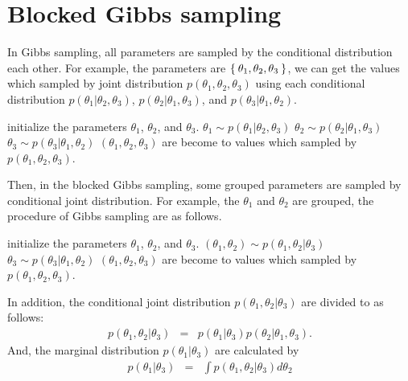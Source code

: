 \documentclass[a4paper]{article}
\begin{document}
	\section{Blocked Gibbs sampling}
	In Gibbs sampling, all parameters are sampled by the conditional distribution each other.
	For example, the parameters are $\Set{\theta_1, \theta_2, \theta_3}$, we can get the values which sampled by joint distribution $p(\theta_1, \theta_2, \theta_3)$ using each conditional distribution $p(\theta_1 | \theta_2, \theta_3)$, $p(\theta_2 | \theta_1, \theta_3)$, and $p(\theta_3 | \theta_1, \theta_2)$.
	\begin{algorithmic}[1]
		\STATE initialize the parameters $\theta_1$, $\theta_2$, and $\theta_3$.
			\STATE $\theta_1 \sim p(\theta_1 | \theta_2, \theta_3)$
			\STATE $\theta_2 \sim p(\theta_2 | \theta_1, \theta_3)$
			\STATE $\theta_ 3\sim p(\theta_3 | \theta_1, \theta_2)$
		\ENDWHILE
		\STATE $(\theta_1, \theta_2, \theta_3)$ are become to values which sampled by $p(\theta_1, \theta_2, \theta_3)$.
	\end{algorithmic}
	Then, in the blocked Gibbs sampling, some grouped parameters are sampled by conditional joint distribution.
	For example, the $\theta_1$ and $\theta_2$ are grouped, the procedure of Gibbs sampling are as follows.
	\begin{algorithmic}[1]
		\STATE initialize the parameters $\theta_1$, $\theta_2$, and $\theta_3$.
			\STATE $(\theta_1, \theta_2) \sim p(\theta_1, \theta_2 | \theta_3)$
			\STATE $\theta_ 3\sim p(\theta_3 | \theta_1, \theta_2)$
		\ENDWHILE
		\STATE $(\theta_1, \theta_2, \theta_3)$ are become to values which sampled by $p(\theta_1, \theta_2, \theta_3)$.
	\end{algorithmic}
	In addition, the conditional joint distribution $p(\theta_1, \theta_2 | \theta_3)$ are divided to as follows:
	\begin{eqnarray}
	p(\theta_1, \theta_2 | \theta_3) &=& p(\theta_1 | \theta_3) p(\theta_2 | \theta_1, \theta_3).
	\end{eqnarray}
	And, the marginal distribution $p(\theta_1 | \theta_3)$ are calculated by
	\begin{eqnarray}
	p(\theta_1 | \theta_3) &=& \int{p(\theta_1 , \theta_2 | \theta_3) d\theta_2}
	\end{eqnarray}
\end{document}
